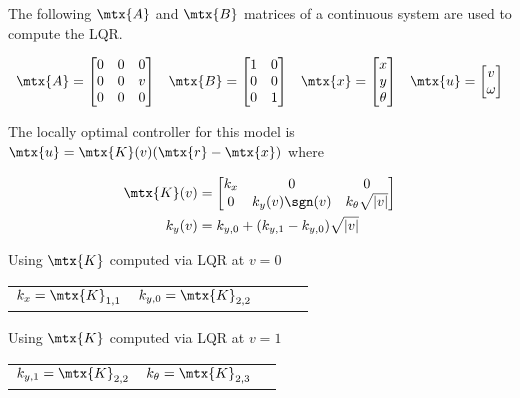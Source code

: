 \begin{theorem}
  The following $\mtx{A}$ and $\mtx{B}$ matrices of a continuous system are used
  to compute the LQR.

  \begin{equation}
    \begin{array}{llll}
      \mtx{A} =
      \begin{bmatrix}
        0 & 0 & 0 \\
        0 & 0 & v \\
        0 & 0 & 0
      \end{bmatrix} &
      \mtx{B} =
      \begin{bmatrix}
        1 & 0 \\
        0 & 0 \\
        0 & 1
      \end{bmatrix} &
      \mtx{x} = \begin{bmatrix}x \\ y \\ \theta\end{bmatrix} &
      \mtx{u} = \begin{bmatrix}v \\ \omega\end{bmatrix}
    \end{array}
  \end{equation}

  The locally optimal controller for this model is
  $\mtx{u} = \mtx{K}(v) (\mtx{r} - \mtx{x})$ where

  \begin{align}
    \mtx{K}(v) &= \begin{bmatrix}
      k_x & 0 & 0 \\
      0 & k_y(v) \sgn(v) & k_{\theta} \sqrt{|v|}
    \end{bmatrix} \\
    k_y(v) &= k_{y, 0} + (k_{y, 1} - k_{y, 0}) \sqrt{|v|}
  \end{align}

  Using $\mtx{K}$ computed via LQR at $v = 0$
  \begin{figurekey}
    \begin{tabular}{lllll}
      $k_x = \mtx{K}_{1, 1}$ & $k_{y, 0} = \mtx{K}_{2, 2}$
    \end{tabular}
  \end{figurekey}

  Using $\mtx{K}$ computed via LQR at $v = 1$
  \begin{figurekey}
    \begin{tabular}{lll}
        $k_{y, 1} = \mtx{K}_{2, 2}$ & $k_{\theta} = \mtx{K}_{2, 3}$
    \end{tabular}
  \end{figurekey}
\end{theorem}
